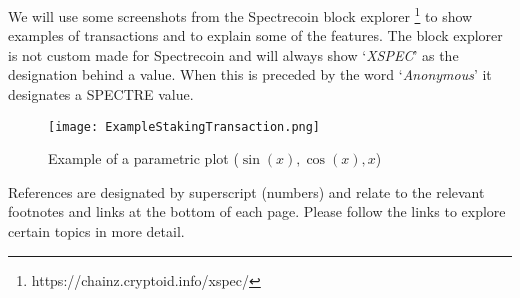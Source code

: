 We will use some screenshots from the Spectrecoin block explorer
\footnote{https://chainz.cryptoid.info/xspec/} to show examples of
transactions and to explain some of the features. The block explorer
is not custom made for Spectrecoin and will always show ‘\textit{XSPEC}’
as the designation behind a value. When this is preceded by the word
‘\textit{Anonymous}’ it designates a SPECTRE value.

\begin{figure}[h]
	\caption{Example of a parametric plot ($\sin (x), \cos(x), x$)}
	\centering
	\texttt{[image: ExampleStakingTransaction.png]}
\end{figure}


References are designated by superscript (numbers) and relate to the relevant
footnotes and links at the bottom of each page. Please follow the links to
explore certain topics in more detail.
